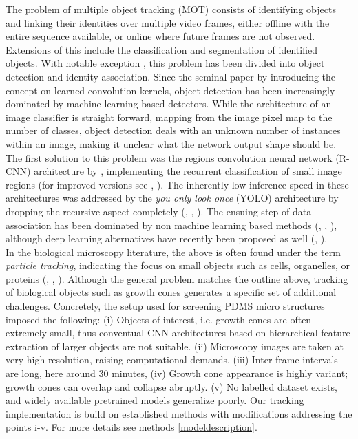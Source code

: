 The problem of multiple object tracking (MOT) consists of identifying objects
and linking their identities over multiple video frames, either offline with the
entire sequence available, or online where future frames are not observed.
Extensions of this include the classification and segmentation of identified
objects. With notable exception \parencite{graphmot}, this problem has been
divided into object detection and identity association. Since the seminal paper
by \cite{alexnet} introducing the concept on learned convolution kernels, object
detection has been increasingly dominated by machine learning based detectors.
While the architecture of an image classifier is straight forward, mapping from
the image pixel map to the number of classes, object detection deals with an
unknown number of instances within an image, making it unclear what the network
output shape should be. The first solution to this problem was the regions
convolution neural network (R-CNN) architecture by \cite{rcnn},
implementing the recurrent classification of small image regions (for improved
versions see \cite{fastrcnn}, \cite{fasterrcnn}). The inherently low inference
speed in these architectures was addressed by the \textit{you only look once}
(YOLO) architecture by dropping the recursive aspect completely (\cite{yolo},
\cite{yolo3}, \cite{yolo5}). The ensuing step of data association has been
dominated by non machine learning based methods (\cite{sort}, \cite{hungarian},
\cite{MCF}), although deep learning alternatives have recently been proposed as
well (\cite{deepsort}, \cite{assreview}). \\

In the biological microscopy literature, the above is often found under the term
\textit{particle tracking}, indicating the focus on small objects such as cells,
organelles, or proteins (\cite{celltracking}, \cite{organelltracking},
\cite{proteintracking}). Although the general problem matches the outline above,
tracking of biological objects such as growth cones generates a specific set
of additional challenges. Concretely, the setup used for screening PDMS micro
structures imposed the following: (i) Objects of interest, i.e. growth cones are
often extremely small, thus conventual CNN architectures based on hierarchical
feature extraction of larger objects are not suitable. (ii) Microscopy images
are taken at very high resolution, raising computational demands. (iii)
Inter frame intervals are long, here around 30 minutes, (iv) Growth cone
appearance is highly variant; growth cones can overlap and collapse abruptly.
(v) No labelled dataset exists, and widely available pretrained models
generalize poorly. Our tracking implementation is build on established methods
with modifications addressing the points i-v. For more details see methods
\ref{modeldescription}. \\



